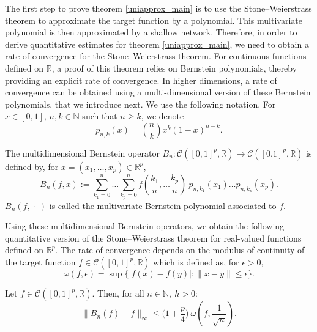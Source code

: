 \documentclass[anon,12pt]{colt2021} %
\begin{document}
The first step to prove theorem \ref{uniapprox_main} is to use the Stone--Weierstrass theorem to approximate the target function by a polynomial. This multivariate polynomial is then approximated by a shallow network. Therefore, in order to derive quantitative estimates for theorem \ref{uniapprox_main},  we need to obtain a rate of convergence for the Stone--Weierstrass theorem. For continuous functions defined on $\mathbb{R}$, a proof of this theorem relies on Bernstein polynomials, thereby providing an explicit rate of convergence. In higher dimensions, a rate of convergence can be obtained using a multi-dimensional version of these Bernstein polynomials, that we introduce next. We use the following notation. For $x \in [0,1]$, $n, k \in \mathbb{N}$ such that $n \geq k$, we denote
\begin{equation*}
    p_{n,k}(x) = 
    \binom{n}{k}
    x^{k}(1-x)^{n-k}.
\end{equation*}

\begin{definition}\label{BernPolydef}
The multidimensional Bernstein operator $B_{n}: \mathcal{C}([0,1]^{p}, \mathbb{R}) \rightarrow \mathcal{C}([0.1]^{p}, \mathbb{R})$ is defined by, for $x = (x_{1}, \dots, x_{p}) \in \mathbb{R}^{p}$,
\begin{equation*}
    B_{n}(f,x) := \sum_{k_{1}=0}^{n} \dots \sum_{k_{p}=0}^{n} f(\frac{k_{1}}{n}, \dots \frac{k_{p}}{n}) \ p_{n, k_{1}}(x_{1}) \dots p_{n, k_{p}}(x_{p}).
\end{equation*}
$B_{n}(f, \, \cdot \,)$ is called the multivariate Bernstein polynomial associated to $f$.
\end{definition}

Using these multidimensional Bernstein operators, we obtain the following quantitative version of the Stone--Weierstrass theorem for real-valued functions defined on $\mathbb{R}^{p}$. The rate of convergence depends on the modulus of continuity of the target function $f \in \mathcal{C}([0,1]^{p}, \mathbb{R})$ which is defined as, for $\epsilon > 0$,
\begin{equation*}
    \omega(f, \epsilon) = \sup \{ \vert f(x) - f(y) \vert: \| x - y\| \leq \epsilon \}.
\end{equation*}

\begin{proposition} \label{prop_BernApprox} 
Let $f \in \mathcal{C}([0,1]^{p}, \mathbb{R})$. Then, for all $n \in \mathbb{N}, \ h>0$:
\begin{equation*}
    \| B_{n}(f) - f \|_{\infty} \leq \bigg(1 + \frac{p}{4} \bigg) \ \omega(f, \frac{1}{\sqrt{n}}).
\end{equation*}
\end{proposition}
\end{document}
